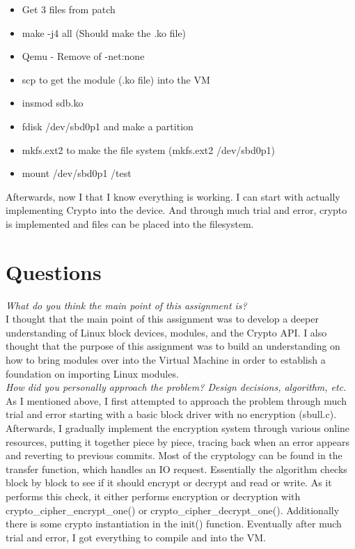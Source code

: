 \documentclass[letterpaper,10pt,titlepage]{article}
\begin{document}
\begin{itemize}
\item Get 3 files from patch
\item make -j4 all (Should make the .ko file)
\item Qemu - Remove of -net:none
\item scp to get the module (.ko file) into the VM
\item insmod sdb.ko
\item fdisk /dev/sbd0p1 and make a partition
\item mkfs.ext2 to make the file system (mkfs.ext2 /dev/sbd0p1)
\item mount /dev/sbd0p1 /test
\end{itemize}

Afterwards, now I that I know everything is working.  I can start with actually implementing Crypto into the device.  And through much trial and error, crypto is implemented and files can be placed into the filesystem.\\

\section{Questions}

\textit{What do you think the main point of this assignment is?}\\

I thought that the main point of this assignment was to develop a deeper understanding of Linux block devices, modules, and the Crypto API.  I also thought that the purpose of this assignment was to build an understanding on how to bring modules over into the Virtual Machine in order to establish a foundation on importing Linux modules.\\

\textit{How did you personally approach the problem? Design decisions, algorithm, etc.}\\

As I mentioned above, I first attempted to approach the problem through much trial and error starting with a basic block driver with no encryption (sbull.c).  Afterwards, I gradually implement the encryption system through various online resources, putting it together piece by piece, tracing back when an error appears and reverting to previous commits.  Most of the cryptology can be found in the transfer function, which handles an IO request.  Essentially the algorithm checks block by block to see if it should encrypt or decrypt and read or write.  As it performs this check, it either performs encryption or decryption with crypto\_cipher\_encrypt\_one() or crypto\_cipher\_decrypt\_one().  Additionally there is some crypto instantiation in the init() function.  Eventually after much trial and error, I got everything to compile and into the VM.\\
\end{document}
